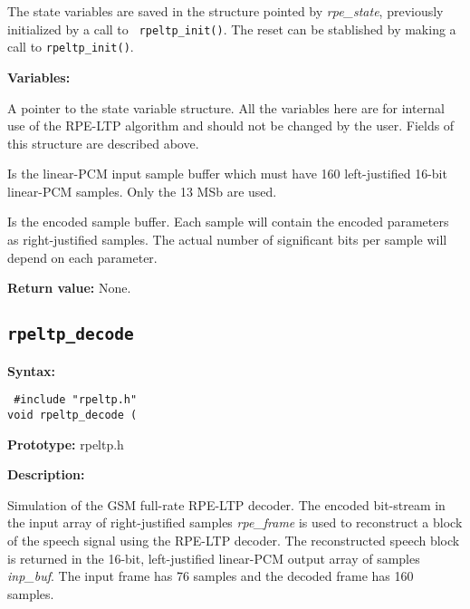         The state variables are saved in the structure pointed by {\em
        rpe\_state}, previously initialized by a call to {\tt
        rpeltp\_init()}. The reset can be stablished by making a call
        to {\tt rpeltp\_init()}.

{\bf Variables: }
\begin{Descr}{\DescrLen}
\item[\pbox{20mm}{\em rpe\_state}] %
               A pointer to the state variable structure. All the
               variables here are for internal use of the RPE-LTP
               algorithm and should not be changed by the
               user. Fields of this structure are described above.

\item[\pbox{20mm}{\em inp\_buf}] %
               Is the linear-PCM input sample buffer which must have 160
               left-justified 16-bit linear-PCM \short samples. Only
               the 13 MSb are used.

\item[\pbox{20mm}{\em rpe\_frame}] %
               Is the encoded sample buffer. Each \short sample will
               contain the encoded parameters as right-justified
               samples. The actual number of significant bits per
               sample will depend on each parameter.
\end{Descr}

        {\bf Return value: }        None.


\subsection{{\tt rpeltp\_decode}} \label{sec:rpedecode}

{\bf Syntax: }

{\tt
\#include "rpeltp.h"\\
void rpeltp\_decode (
}

{\bf Prototype: }    rpeltp.h

{\bf Description: }

        Simulation of the GSM full-rate RPE-LTP decoder. The encoded
        bit-stream in the input array of right-justified \short
        samples {\em rpe\_frame} is used to reconstruct a block of the
        speech signal using the RPE-LTP decoder. The reconstructed
        speech block is returned in the 16-bit, left-justified
        linear-PCM output array of \short samples {\em inp\_buf}. The
        input frame has 76 samples and the decoded frame has 160
        samples.

